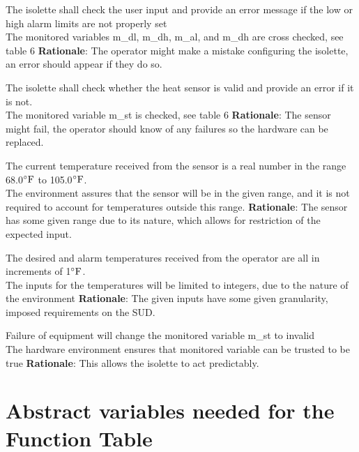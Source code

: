 \documentclass[fontsize=12pt,paper=letter,twoside]{scrartcl}
\begin{document}
{The isolette shall check the user input and provide an error message if the low or high alarm limits are not properly set\\}
{The monitored variables m\_dl, m\_dh, m\_al, and m\_dh are cross checked, see table 6}
\label{R5}
\textbf{Rationale}: The operator might make a mistake configuring the isolette, an error should appear if they do so.

{The isolette shall check whether the heat sensor is valid and provide an error if it is not.\\}
{The monitored variable m\_st is checked, see table 6}
\label{R6}
\textbf{Rationale}: The sensor might fail, the operator should know of any failures so the hardware can be replaced.

{The current temperature received from the sensor is a real number in the range 68.0$^{\circ}\mathrm{F}$ to 105.0$^{\circ}\mathrm{F}$.\\}
{The environment assures that the sensor will be in the given range, and it is not required to account for temperatures outside this range.}
\label{E7}
\textbf{Rationale}: The sensor has some given range due to its nature, which allows for restriction of the expected input.

{The desired and alarm temperatures received from the operator are all in increments of 1$^{\circ}\mathrm{F}$.\\}
{The inputs for the temperatures will be limited to integers, due to the nature of the environment}
\label{E8}
\textbf{Rationale}: The given inputs have some given granularity, imposed requirements on the SUD.

{Failure of equipment will change the monitored variable m\_st to invalid\\}
{The hardware environment ensures that monitored variable can be trusted to be true}
\label{E9}
\textbf{Rationale}: This allows the isolette to act predictably.

\section{Abstract variables needed for the Function Table}
\end{document}

